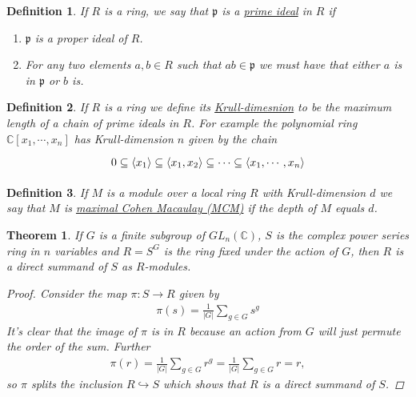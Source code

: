 \documentclass[11pt, a4paper, english]{article}
\numberwithin{prop}{section}
\numberwithin{lemma}{section}
\newtheorem{theorem}{Theorem}
\numberwithin{theorem}{section}
\newtheorem{defin}{Definition}
\numberwithin{defin}{section}
\numberwithin{example}{section}
\newcommand{\C}{\mathbb{C}}
\begin{document}
\begin{defin}
If $R$ is a ring, we say that $\mathfrak{p}$ is  a \underline{prime ideal} in $R$ if
\begin{enumerate}
\item $\mathfrak{p}$ is a proper ideal of $R$.
\item For any two elements $a,b \in R$ such that $ab \in \mathfrak{p}$ we must have that either $a$ is in $\mathfrak{p}$ or $b$ is.
\end{enumerate}
\end{defin}

\begin{defin}
If $R$ is a ring we define its \underline{Krull-dimesnion} to be the maximum length of a chain of prime ideals in $R$. For example the polynomial ring $\C[x_1, \cdots, x_n]$ has Krull-dimension $n$ given by the chain
\begin{equation*}
\begin{tikzcd}
0 \subseteq \langle x_1 \rangle \subseteq \langle x_1, x_2 \rangle \subseteq \cdots \subseteq \langle x_1, \cdots, x_n \rangle
\end{tikzcd}
\end{equation*}
\end{defin}

\begin{defin}
If $M$ is a module over a local ring $R$ with Krull-dimension $d$ we say that $M$ is \underline{maximal Cohen Macaulay (MCM)} if the depth of $M$ equals $d$.
\end{defin}

\begin{theorem}
If $G$ is a finite subgroup of $GL_n(\C)$, $S$ is the complex power series ring in $n$ variables and $R = S^G$ is the ring fixed under the action of $G$, then $R$ is a direct summand of $S$ as $R$-modules.

\begin{proof}
Consider the map $\pi: S \to R$ given by
\begin{align*}
\pi(s) = \frac{1}{|G|} \sum_{g\in G} s^g
\end{align*}
It's clear that the image of $\pi$ is in $R$ because an action from $G$ will just permute the order of the sum. Further \begin{align*}
\pi(r) = \frac{1}{|G|} \sum_{g\in G} r^g = \frac{1}{|G|} \sum_{g\in G} r = r,
\end{align*}
so $\pi$ splits the inclusion $R \hookrightarrow S$ which shows that $R$ is a direct summand of $S$.
\end{proof}
\end{theorem}
\end{document}
